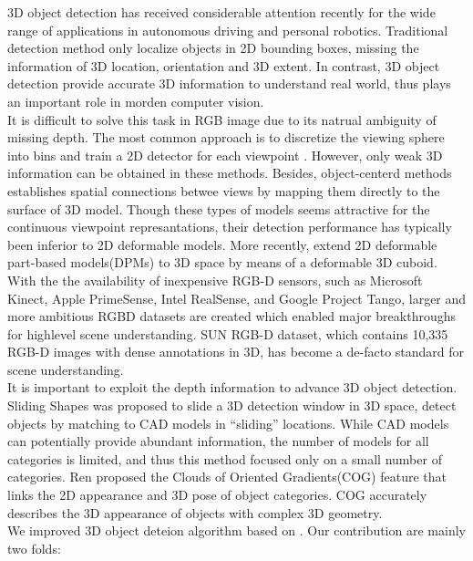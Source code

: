 \documentclass[english]{ccdconf}
\begin{document}
3D object detection has received considerable attention recently for the wide range of applications in autonomous driving and personal robotics\cite{xiang2014beyond}. Traditional detection method only localize objects in 2D bounding boxes, missing the information of 3D location, orientation and 3D extent. In contrast, 3D object detection provide accurate 3D information to understand real world, thus plays an important role in morden computer vision.\\
It is difficult to solve this task in RGB image due to its natrual ambiguity of missing depth. The most common approach is to discretize the viewing sphere into bins and train a 2D detector for each viewpoint \cite{gu2010discriminative}. However, only weak 3D information can be obtained in these methods. Besides, object-centerd methods establishes spatial connections betwee views by mapping them directly to the surface of 3D model. Though these types of models seems attractive for the continuous viewpoint represantations, their detection performance has typically been inferior to 2D deformable models. More recently, \cite{fidler20123d} extend 2D deformable part-based models(DPMs)\cite{felzenszwalb2010object} to 3D space by means of a deformable 3D cuboid.\\
With the the availability of inexpensive RGB-D sensors, such as Microsoft Kinect, Apple PrimeSense, Intel RealSense, and Google Project Tango, larger and more ambitious RGBD datasets are created which enabled major breakthroughs for highlevel scene understanding\cite{silberman2012indoor,janoch2013category}. SUN RGB-D dataset\cite{song2015sun}, which contains 10,335 RGB-D images with dense annotations in 3D, has become a de-facto standard for scene understanding.\\
It is important to exploit the depth information to advance 3D object detection. Sliding Shapes\cite{song2014sliding} was proposed to slide a 3D detection window in 3D space, detect objects by matching to CAD models in “sliding” locations. While CAD models can potentially provide abundant information, the number of models for all categories is limited, and thus this method focused only on a small number of categories. Ren\cite{ren2016three} proposed the Clouds of Oriented Gradients(COG) feature that links the 2D appearance and 3D pose of object categories. COG accurately describes the 3D appearance of objects with complex 3D geometry.\\
We improved 3D object deteion algorithm based on \cite{ren2016three}. Our contribution are mainly two folds:
\end{document}
